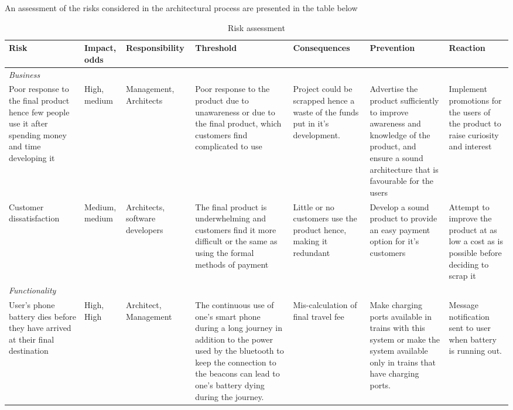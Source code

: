 An assessment of the risks considered in the architectural process are presented in the table below 
{
  \renewcommand{\arraystretch}{0.8}
  \begin{sidewaystable}
    \centering
    \caption{Risk assessment}
    \label{tbl:risk_assessment}
    \begin{tabularx}{\textwidth}{XXXXXXX}
      \textbf{Risk} & \textbf{Impact, odds} & \textbf{Responsibility} & \textbf{Threshold} & \textbf{Consequences} & \textbf{Prevention} & \textbf{Reaction} \\ \hline
      \multicolumn{7}{l}{\textit{Business}} \\ \hline
      Poor response to the final product hence few people use it after spending money and time developing it & High, medium & Management, Architects & Poor response to the product due to unawareness or due to the final product, which customers find complicated to use & Project could be scrapped hence a waste of the funds put in it's development. & Advertise the product sufficiently to improve awareness and knowledge of the product, and ensure a sound architecture that is favourable for the users & Implement promotions for the users of the product to raise curiosity and interest \\ \hline
      Customer dissatisfaction  & Medium, medium & Architects, software developers & The final product is underwhelming and customers find it more difficult or the same as using the formal methods of payment & Little or no customers use the product hence, making it redundant & Develop a sound product to provide an easy payment option for it's customers &Attempt to improve the product at as low a cost as is possible before deciding to scrap it \\ \hline
      \multicolumn{7}{l}{\textit{Functionality}} \\ \hline
      User's phone battery dies before they have arrived at their final destination & High, High & Architect, Management & The continuous use of one's smart phone during a long journey in addition to the power used by the bluetooth to keep the connection to the beacons can lead to one's battery dying during the journey. & Mis-calculation of final travel fee & Make charging ports available in trains with this system or make the system available only in trains that have charging ports. & Message notification sent to user when battery is running out. \\ \hline
    \end{tabularx}
  \end{sidewaystable}
}

